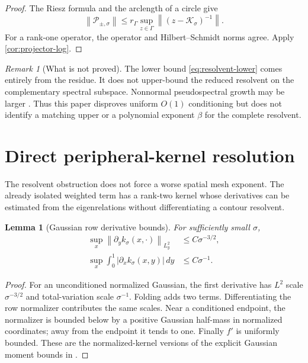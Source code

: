 \documentclass[11pt]{article}
\newtheorem{lemma}[theorem]{Lemma}
\theoremstyle{remark}
\newtheorem{remark}[theorem]{Remark}
\newcommand{\cK}{\mathcal K}
\newcommand{\cP}{\mathcal P}
\newcommand{\norm}[1]{\left\lVert#1\right\rVert}
\begin{document}
\begin{proof}
The Riesz formula and the arclength of a circle give
\begin{equation}
 \norm{\cP_{\pm,\sigma}}
 \le r_\Gamma
 \sup_{z\in\Gamma}\norm{(z-\cK_\sigma)^{-1}}.
 \label{eq:riesz-circle}
\end{equation}
For a rank-one operator, the operator and Hilbert--Schmidt norms agree.
Apply \cref{cor:projector-log}.
\end{proof}

\begin{remark}[What is not proved]
\label{rem:reduced-resolvent}
The lower bound \eqref{eq:resolvent-lower} comes entirely from the residue.
It does not upper-bound the reduced resolvent on the complementary spectral
subspace.  Nonnormal pseudospectral growth may be larger
\citep{GohbergKrein1969,Kato1995}.  Thus this paper disproves uniform $O(1)$
conditioning but does not identify a matching upper or a polynomial exponent
$\beta$ for the complete resolvent.
\end{remark}

\section{Direct peripheral-kernel resolution}
\label{sec:kernel-resolution}

The resolvent obstruction does not force a worse spatial mesh exponent.
The already isolated weighted term has a rank-two kernel whose derivatives
can be estimated from the eigenrelations without differentiating a contour
resolvent.

\begin{lemma}[Gaussian row derivative bounds]
\label{lem:gaussian-derivatives}
For sufficiently small $\sigma$,
\begin{align}
 \sup_x\norm{\partial_y k_\sigma(x,\cdot)}_{L^2_y}
 &\le C\sigma^{-3/2},
 \label{eq:target-row-derivative}\\
 \sup_x\int_0^1|\partial_x k_\sigma(x,y)|\,dy
 &\le C\sigma^{-1}.
 \label{eq:source-row-variation}
\end{align}
\end{lemma}

\begin{proof}
For an unconditioned normalized Gaussian, the first derivative has $L^2$
scale $\sigma^{-3/2}$ and total-variation scale $\sigma^{-1}$.  Folding adds
two terms.  Differentiating the row normalizer contributes the same scales.
Near a conditioned endpoint, the normalizer is bounded below by a positive
Gaussian half-mass in normalized coordinates; away from the endpoint it
tends to one.  Finally $f'$ is uniformly bounded.  These are the
normalized-kernel versions of the explicit Gaussian moment bounds in
\citep{WangSmallNoiseMesh2026}.
\end{proof}
\end{document}
